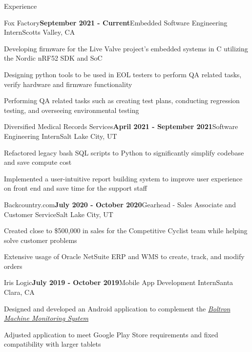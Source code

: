\documentclass{resume}
\begin{document}
\begin{rSection}{\large Experience}

\begin{rSubsection}{Fox Factory}{\bf{September 2021 - Current}}{Embedded Software Engineering Intern}{Scotts Valley, CA }
\item Developing firmware for the Live Valve project's embedded systems in C utilizing the Nordic nRF52 SDK and SoC
\item Designing python tools to be used in EOL testers to perform QA related tasks, verify hardware and firmware functionality
\item Performing QA related tasks such as creating test plans, conducting regression testing, and overseeing environmental testing
\end{rSubsection}

\begin{rSubsection}{Diversified Medical Records Services}{\bf{April 2021 - September 2021}}{Software Engineering Intern}{Salt Lake City, UT }
\item Refactored legacy bash SQL scripts to Python to significantly simplify codebase and save compute cost
\item Implemented a user-intuitive report building system to improve user experience on front end and save time for the support staff
\end{rSubsection}

\begin{rSubsection}{Backcountry.com}{\bf{July 2020 - October 2020}}{Gearhead - Sales Associate and Customer Service}{Salt Lake City, UT }
\item Created close to \$500,000 in sales for the Competitive Cyclist team while helping solve customer problems
\item Extensive usage of Oracle NetSuite ERP and WMS to create, track, and modify orders
\end{rSubsection}

\begin{rSubsection}{Iris Logic}{\bf{July 2019 - October 2019}}{Mobile App Development Intern}{Santa Clara, CA }
 \item Designed and developed an Android application to complement the \emph{\href{https://irislogic.com/boltron-machine-monitoring-system/}{Boltron Machine Monitoring System}}
\item Adjusted application to meet Google Play Store requirements and fixed compatibility with larger tablets
\end{rSubsection}

\end{rSection}
\end{document}
